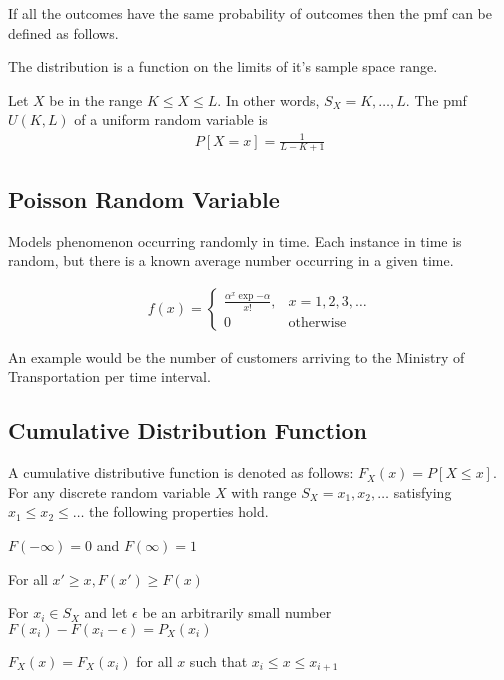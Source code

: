\documentclass[12pt, titlepage, oneside]{article}
\begin{document}
If all the outcomes have the same probability of outcomes then the pmf can be defined as follows. 

The distribution is a function on the limits of it's sample space range. 

Let $X$ be in the range $K \leq X \leq L$. In other words, $S_X = {K, \dots, L}$. The pmf $U(K,L)$ of a uniform random variable is
\begin{align}
P[X = x]  = \frac{1}{L-K+1}
\end{align}

\subsection{Poisson Random Variable}

Models phenomenon occurring randomly in time. Each instance in time is random, but there is a known average number occurring in a given time.

\begin{align}
f(x) = \begin{cases} \frac{ \alpha^x \exp{-\alpha}}{x!}, & x=1,2,3,\dots \\ 0 & \mbox{otherwise} \end{cases}
\end{align}

An example would be the number of customers arriving to the Ministry of Transportation per time interval.

\subsection{Cumulative Distribution Function}

A cumulative distributive function is denoted as follows:
$F_X(x) = P[X \leq x]$. For any discrete random variable $X$ with range $S_X = {x_1, x_2, \dots}$ satisfying $x_1 \leq x_2 \leq \dots$ the following properties hold.

\items
\item $F(-\infty) = 0$ and $F(\infty) = 1$
\item For all $x' \geq x, F(x') \geq F(x)$
\item For $x_i \in S_X$ and let $\epsilon$ be an arbitrarily small number $F(x_i) - F(x_i - \epsilon) = P_X(x_i)$
\item $F_X(x) = F_X(x_i)$ for all $x$ such that $x_i \leq x \le x_{i+1}$
\eitems
\end{document}
